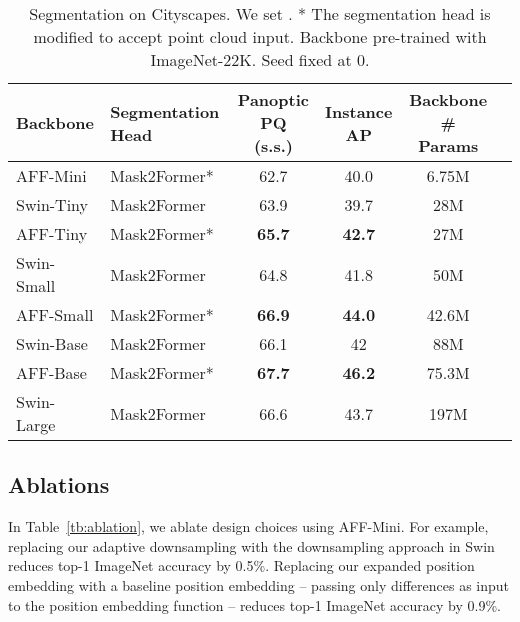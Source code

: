 \documentclass[10pt,twocolumn,letterpaper]{article}
\begin{document}
\begin{table}
\begin{center}
\begin{footnotesize}
\begin{tabular}{llcccc}
Backbone & \makecell{Segmentation\\Head} & \makecell{Panoptic \\PQ (s.s.)} & \makecell{Instance\\AP} & \makecell{Backbone\\\# Params} 
\\\hline
AFF-Mini & Mask2Former*~\cite{mask2} & 62.7 & 40.0 & 6.75M 
\\\hdashline
Swin-Tiny & Mask2Former~\cite{mask2} & 63.9 & 39.7 & 28M 
\\
AFF-Tiny & Mask2Former*~\cite{mask2} & \textbf{65.7} & \textbf{42.7} & 27M 
\\
\hdashline
Swin-Small & Mask2Former~\cite{mask2} & 64.8 & 41.8 & 50M\\ 
AFF-Small & Mask2Former*~\cite{mask2} & \textbf{66.9} & \textbf{44.0} & 42.6M\\ \hdashline
Swin-Base & Mask2Former~\cite{mask2} & 66.1 & 42 & 88M \\
AFF-Base & Mask2Former*~\cite{mask2} & \textbf{67.7} & \textbf{46.2} & 75.3M\\ \hdashline
Swin-Large & Mask2Former~\cite{mask2} & 66.6 & 43.7 & 197M\\ 
\hline
\end{tabular}
\end{footnotesize}
\end{center}
\vspace{-0.55cm}
\caption{Segmentation on Cityscapes. We set . * The segmentation head is modified to accept point cloud input.  Backbone pre-trained with ImageNet-22K. Seed fixed at 0.}
\label{tb:cityscapes}
\vskip -0.15in
\end{table}

\subsection{Ablations}

In Table~\ref{tb:ablation}, we ablate design choices using AFF-Mini. For example, replacing our adaptive downsampling with the downsampling approach in Swin\cite{swin} reduces top-1 ImageNet accuracy by 0.5\%. Replacing our expanded position embedding with a baseline position embedding -- passing only  differences as input to the position embedding function -- reduces top-1 ImageNet accuracy by 0.9\%. 
\end{document}
